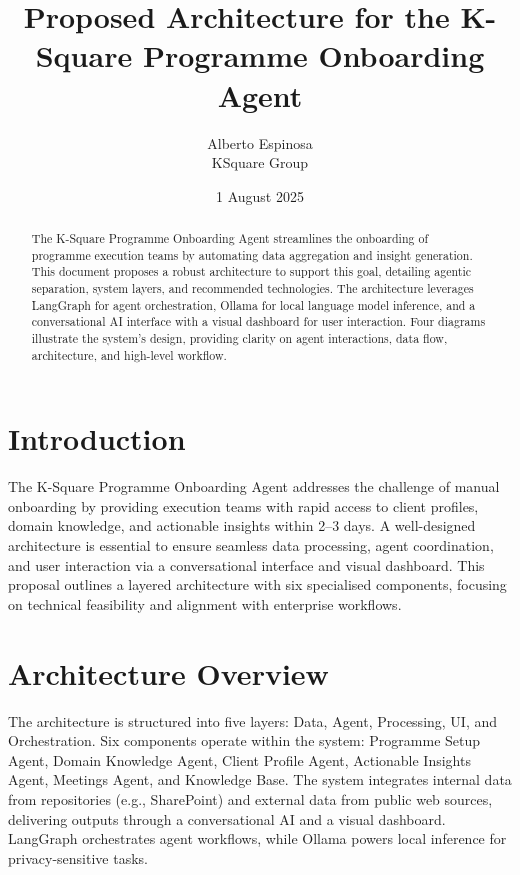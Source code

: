 \documentclass{article}
\begin{document}
\title{Proposed Architecture for the K-Square Programme Onboarding Agent}
\author{Alberto Espinosa \\ KSquare Group}
\date{1 August 2025}
\maketitle

\begin{abstract}
The K-Square Programme Onboarding Agent streamlines the onboarding of programme execution teams by automating data aggregation and insight generation. This document proposes a robust architecture to support this goal, detailing agentic separation, system layers, and recommended technologies. The architecture leverages LangGraph for agent orchestration, Ollama for local language model inference, and a conversational AI interface with a visual dashboard for user interaction. Four diagrams illustrate the system’s design, providing clarity on agent interactions, data flow, architecture, and high-level workflow.
\end{abstract}

\section{Introduction}
The K-Square Programme Onboarding Agent addresses the challenge of manual onboarding by providing execution teams with rapid access to client profiles, domain knowledge, and actionable insights within 2–3 days. A well-designed architecture is essential to ensure seamless data processing, agent coordination, and user interaction via a conversational interface and visual dashboard. This proposal outlines a layered architecture with six specialised components, focusing on technical feasibility and alignment with enterprise workflows.

\section{Architecture Overview}
The architecture is structured into five layers: Data, Agent, Processing, UI, and Orchestration. Six components operate within the system: Programme Setup Agent, Domain Knowledge Agent, Client Profile Agent, Actionable Insights Agent, Meetings Agent, and Knowledge Base. The system integrates internal data from repositories (e.g., SharePoint) and external data from public web sources, delivering outputs through a conversational AI and a visual dashboard. LangGraph orchestrates agent workflows, while Ollama powers local inference for privacy-sensitive tasks.
\end{document}
